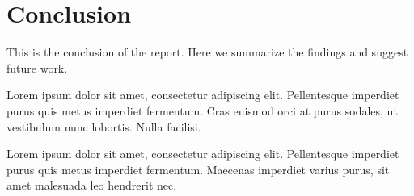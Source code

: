 \documentclass[a4paper, 12pt]{article}
\begin{document}
\newpage

\section*{Conclusion}
This is the conclusion of the report. Here we summarize the findings and suggest future work.

Lorem ipsum dolor sit amet, consectetur adipiscing elit. Pellentesque imperdiet purus quis metus imperdiet fermentum. Cras euismod orci at purus sodales, ut vestibulum nunc lobortis. Nulla facilisi.

Lorem ipsum dolor sit amet, consectetur adipiscing elit. Pellentesque imperdiet purus quis metus imperdiet fermentum. Maecenas imperdiet varius purus, sit amet malesuada leo hendrerit nec.
\end{document}
